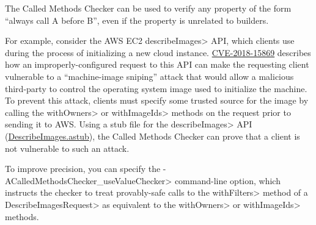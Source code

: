 
The Called Methods Checker can be used to verify any property of the form
``always call A before B'', even if the property is unrelated to builders.

For example, consider the AWS EC2 \<describeImages> API, which
clients use during the process of initializing a new cloud instance.
\href{https://cve.mitre.org/cgi-bin/cvename.cgi?name=CVE-2018-15869}{CVE-2018-15869}
describes how an improperly-configured request to this API can make the
requesting client vulnerable to a ``machine-image sniping'' attack that
would allow a malicious third-party to control the operating system image
used to initialize the machine. To prevent this attack, clients must
specify some trusted source for the image by calling the \<withOwners> or
\<withImageIds> methods on the request prior to sending it to AWS\@. Using
a stub file for the \<describeImages> API
(\href{https://github.com/typetools/checker-framework/blob/master/checker/src/main/java/org/checkerframework/checker/calledmethods/DescribeImages.astub}{DescribeImages.astub}),
the Called Methods Checker can prove that a client is not vulnerable to
such an attack.

To improve precision, you can specify the
\<-ACalledMethodsChecker\_useValueChecker> command-line option, which
instructs the checker to treat provably-safe calls to the \<withFilters>
method of a \<DescribeImagesRequest> as equivalent to the \<withOwners> or
\<withImageIds> methods.
